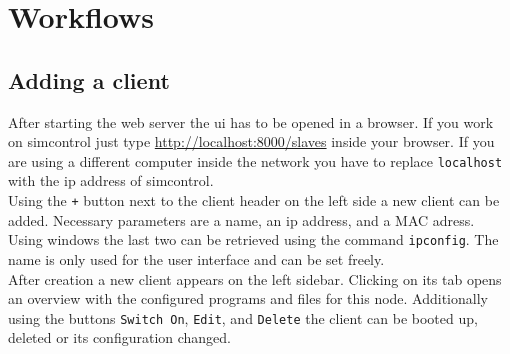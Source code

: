 \documentclass[accentcolor=tud1c, paper=a4, colorback]{tudreport}
\newcommand{\ind}[1]{#1\index{#1}}
\begin{document}
	\chapter{Workflows}
	\section{Adding a client}
	After starting the web server the ui has to be opened in a browser.
	If you work on \ind{simcontrol} just type \url{http://localhost:8000/slaves} inside
	your browser. If you are using a different computer inside the network you
	have to replace \texttt{localhost} with the ip address of simcontrol.
	\\
	Using the \texttt{+} button next to the client header on the left side
	a new client can be added. Necessary parameters are a name, an ip address,
	and a MAC adress. Using windows the last two can be retrieved using
	the command \texttt{ipconfig}. The name is only used for the user interface
	and can be set freely.
	\\
	After creation a new client appears on the left sidebar. Clicking on its tab
	opens an overview with the configured programs and files for this node.
	Additionally using the buttons \texttt{Switch On}, \texttt{Edit}, and \texttt{Delete}
	the client can be booted up, deleted or its configuration changed.
\end{document}
